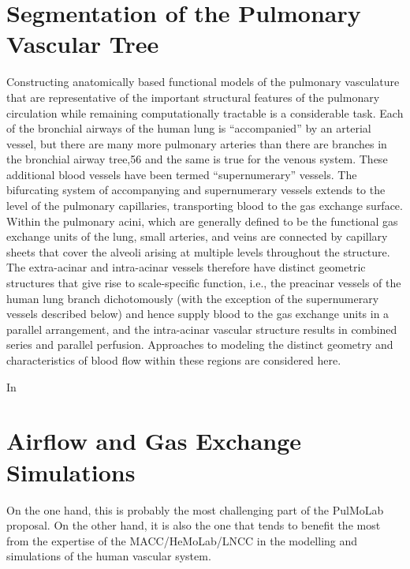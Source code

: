 \section{Segmentation of the Pulmonary Vascular Tree}

\challenge

Constructing anatomically based functional models of the pulmonary vasculature that are representative of the important structural features of the pulmonary circulation while remaining computationally tractable is a considerable task. Each of the bronchial airways of the human lung is “accompanied” by an arterial vessel, but there are many more pulmonary arteries than there are branches in the bronchial airway tree,56 and the same is true for the venous system. These additional blood vessels have been termed “supernumerary” vessels. The bifurcating system of accompanying and supernumerary vessels extends to the level of the pulmonary capillaries, transporting blood to the gas exchange surface. Within the pulmonary acini, which are generally defined to be the functional gas exchange units of the lung, small arteries, and veins are connected by capillary sheets that cover the alveoli arising at multiple levels throughout the structure. The extra-acinar and intra-acinar vessels therefore have distinct geometric structures that give rise to scale-specific function, i.e., the preacinar vessels of the human lung branch dichotomously (with the exception of the supernumerary vessels described below) and hence supply blood to the gas exchange units in a parallel arrangement, and the intra-acinar vascular structure results in combined series and parallel perfusion. Approaches to modeling the distinct geometry and characteristics of blood flow within these regions are considered here.


In \citep{Dongen,Ebrahimdoost,Gutierrez,Linguraru,Shikata,Wala}


\approach


\section{Airflow and Gas Exchange Simulations}

\challenge

On the one hand, this is probably the most challenging part of the PulMoLab proposal. On the other hand, it is also the one that tends to benefit the most from the expertise of the MACC/HeMoLab/LNCC in the modelling and simulations of the human vascular system. 

